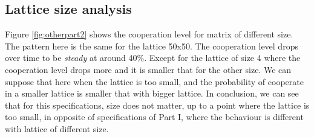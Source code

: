 \documentclass[letterpaper]{article}
\begin{document}
\subsection{Lattice size analysis}

Figure \ref{fig:otherpart2} shows the cooperation level for matrix of
different size. The pattern here is the same for the lattice 50x50. The
cooperation level drops over time to be \textit{steady} at around 40\%.
Except for the lattice of size 4 where the cooperation level drops more and
it is smaller that for the other size. We can suppose that here when the
lattice is too small, and the probability of cooperate in a smaller lattice
is smaller that with bigger lattice. In conclusion, we can see that for
this specifications,
size does not matter, up to a point where the lattice is too small,
in opposite of specifications of Part I, where the behaviour is different
with lattice of different size.
\end{document}
